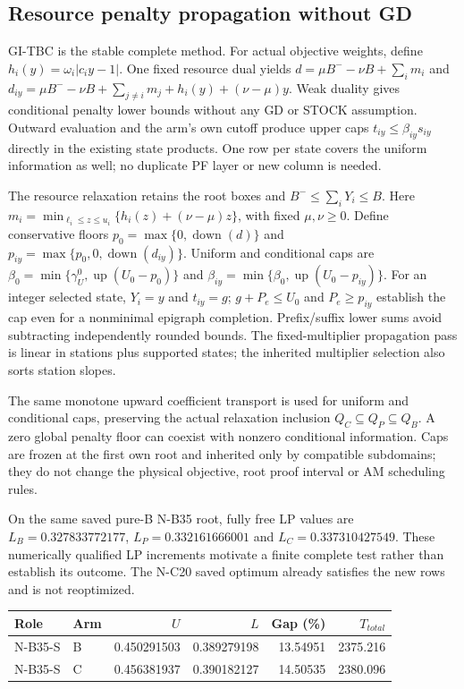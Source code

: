 \subsection{Resource penalty propagation without GD}

GI-TBC is the stable complete method. For actual objective weights, define $h_i(y)=\omega_i|c_i y-1|$. One fixed resource dual yields $d=\mu B^- -\nu B+\sum_i m_i$ and $d_{iy}=\mu B^- -\nu B+\sum_{j\ne i}m_j+h_i(y)+(\nu-\mu)y$. Weak duality gives conditional penalty lower bounds without any GD or STOCK assumption. Outward evaluation and the arm's own cutoff produce upper caps $t_{iy}\le\beta_{iy}s_{iy}$ directly in the existing state products. One row per state covers the uniform information as well; no duplicate PF layer or new column is needed.

The resource relaxation retains the root boxes and $B^-\le\sum_iY_i\le B$. Here $m_i=\min_{\ell_i\le z\le u_i}\{h_i(z)+(\nu-\mu)z\}$, with fixed $\mu,\nu\ge0$. Define conservative floors $p_0=\max\{0,\operatorname{down}(d)\}$ and $p_{iy}=\max\{p_0,0,\operatorname{down}(d_{iy})\}$. Uniform and conditional caps are $\beta_0=\min\{\gamma_U^0,\operatorname{up}(U_0-p_0)\}$ and $\beta_{iy}=\min\{\beta_0,\operatorname{up}(U_0-p_{iy})\}$. For an integer selected state, $Y_i=y$ and $t_{iy}=g$; $g+P_e\le U_0$ and $P_e\ge p_{iy}$ establish the cap even for a nonminimal epigraph completion. Prefix/suffix lower sums avoid subtracting independently rounded bounds. The fixed-multiplier propagation pass is linear in stations plus supported states; the inherited multiplier selection also sorts station slopes.

The same monotone upward coefficient transport is used for uniform and conditional caps, preserving the actual relaxation inclusion $Q_C\subseteq Q_P\subseteq Q_B$. A zero global penalty floor can coexist with nonzero conditional information. Caps are frozen at the first own root and inherited only by compatible subdomains; they do not change the physical objective, root proof interval or AM scheduling rules.

On the same saved pure-B N-B35 root, fully free LP values are $L_B=0.327833772177$, $L_P=0.332161666001$ and $L_C=0.337310427549$. These numerically qualified LP increments motivate a finite complete test rather than establish its outcome. The N-C20 saved optimum already satisfies the new rows and is not reoptimized.

\begin{center}\begin{tabular}{llrrrr}\hline Role & Arm & $U$ & $L$ & Gap (\%) & $T_{total}$ \\ \hline

N-B35-S & B & 0.450291503 & 0.389279198 & 13.54951 & 2375.216 \\

N-B35-S & C & 0.456381937 & 0.390182127 & 14.50535 & 2380.096 \\

\hline\end{tabular}\end{center}

